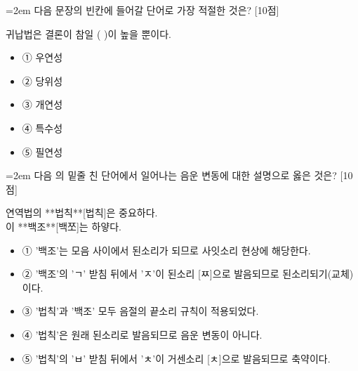 \documentclass[11pt,a4paper]{article}
\newcommand{\qnum}[1]{%
  \tikz[baseline=(num.base)]{%
    \node[circle, fill=numCircle, text=white, inner sep=0pt,
          minimum size=18pt, font=\small\bfseries] (num) {#1};%
  }%
}
\newcommand{\pts}[1]{%
  \hfill\textcolor{ptsBadge}{[#1점]}%
}
\begin{document}
\vspace{4mm}
\begin{minipage}{\columnwidth}
{\hangindent=2em
\qnum{43}\enspace 다음 문장의 빈칸에 들어갈 단어로 가장 적절한 것은? \pts{10}
\par}

\vspace{3mm}
\begin{tcolorbox}[bogi]
귀납법은 결론이 참일 (          )이 높을 뿐이다.
\end{tcolorbox}
\vspace{3mm}
\begin{itemize}[leftmargin=2.5em, labelsep=0.3em, label={}, itemsep=4pt, parsep=1pt, topsep=0pt]
  \item ① 우연성
  \item ② 당위성
  \item ③ 개연성
  \item ④ 특수성
  \item ⑤ 필연성
\end{itemize}
\end{minipage}
\vspace{4mm}

\vspace{4mm}
\begin{minipage}{\columnwidth}
{\hangindent=2em
\qnum{44}\enspace 다음 의 밑줄 친 단어에서 일어나는 음운 변동에 대한 설명으로 옳은 것은? \pts{10}
\par}

\vspace{3mm}
\begin{tcolorbox}[bogi]
연역법의 **법칙**[법칙]은 중요하다. \\{}
이 **백조**[백쪼]는 하얗다.
\end{tcolorbox}
\vspace{3mm}
\begin{itemize}[leftmargin=2.5em, labelsep=0.3em, label={}, itemsep=4pt, parsep=1pt, topsep=0pt]
  \item ① '백조'는 모음 사이에서 된소리가 되므로 사잇소리 현상에 해당한다.
  \item ② '백조'의 'ㄱ' 받침 뒤에서 'ㅈ'이 된소리 [ㅉ]으로 발음되므로 된소리되기(교체)이다.
  \item ③ '법칙'과 '백조' 모두 음절의 끝소리 규칙이 적용되었다.
  \item ④ '법칙'은 원래 된소리로 발음되므로 음운 변동이 아니다.
  \item ⑤ '법칙'의 'ㅂ' 받침 뒤에서 'ㅊ'이 거센소리 [ㅊ]으로 발음되므로 축약이다.
\end{itemize}
\end{minipage}
\vspace{4mm}
\end{document}
